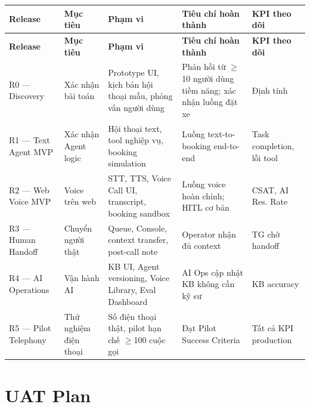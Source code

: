 \documentclass[12pt,a4paper]{article}
\begin{document}
\begin{longtable}{L{2.8cm} L{3cm} L{3.5cm} L{3cm} L{2.5cm}}
  \toprule
  \textbf{Release}&\textbf{Mục tiêu}&\textbf{Phạm vi}&\textbf{Tiêu chí hoàn thành}&\textbf{KPI theo dõi}\\
  \midrule\endfirsthead\toprule{}\textbf{Release}&\textbf{Mục tiêu}&\textbf{Phạm vi}&\textbf{Tiêu chí hoàn thành}&\textbf{KPI theo dõi}\\\midrule\endhead\bottomrule\endlastfoot
  R0 --- Discovery & Xác nhận bài toán & Prototype UI, kịch bản hội thoại mẫu, phỏng vấn người dùng & Phản hồi từ $\geq$10 người dùng tiềm năng; xác nhận luồng đặt xe & Định tính \\
  R1 --- Text Agent MVP & Xác nhận Agent logic & Hội thoại text, tool nghiệp vụ, booking simulation & Luồng text-to-booking end-to-end & Task completion, lỗi tool \\
  R2 --- Web Voice MVP & Voice trên web & STT, TTS, Voice Call UI, transcript, booking sandbox & Luồng voice hoàn chỉnh; HITL cơ bản & CSAT, AI Res. Rate \\
  R3 --- Human Handoff & Chuyển người thật & Queue, Console, context transfer, post-call note & Operator nhận đủ context & TG chờ handoff \\
  R4 --- AI Operations & Vận hành AI & KB UI, Agent versioning, Voice Library, Eval Dashboard & AI Ops cập nhật KB không cần kỹ sư & KB accuracy \\
  R5 --- Pilot Telephony & Thử nghiệm điện thoại & Số điện thoại thật, pilot hạn chế $\geq$100 cuộc gọi & Đạt Pilot Success Criteria & Tất cả KPI production \\
\end{longtable}

\section{UAT Plan}
\end{document}
